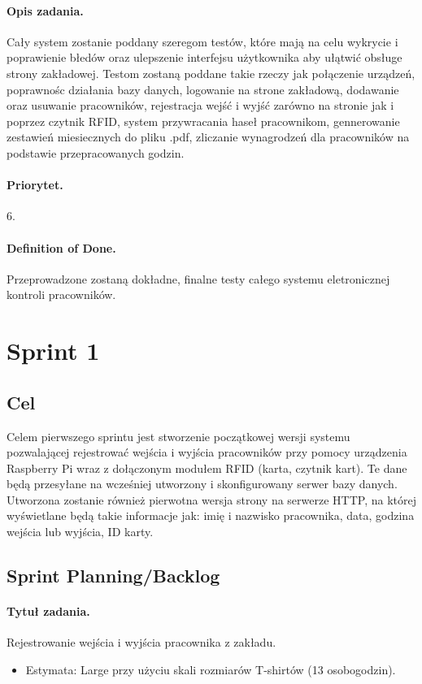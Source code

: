 \documentclass[a4paper]{article}
\begin{document}
\paragraph{Opis zadania.} Cały system zostanie poddany szeregom testów, które mają na celu wykrycie i poprawienie błedów oraz ulepszenie interfejsu użytkownika aby ułątwić obsługe strony zakładowej. Testom zostaną poddane takie rzeczy jak połączenie urządzeń, poprawnośc działania bazy danych, logowanie na strone zakładową, dodawanie oraz usuwanie pracowników, rejestracja wejść i wyjść zarówno na stronie jak i poprzez czytnik RFID, system przywracania haseł pracownikom, gennerowanie zestawień miesiecznych do pliku .pdf, zliczanie wynagrodzeń dla pracowników na podstawie przepracowanych godzin.
\paragraph{Priorytet.} 6.
\paragraph{Definition of Done.} Przeprowadzone zostaną dokładne, finalne testy całego systemu eletronicznej kontroli pracowników.

\section{Sprint 1}
\subsection{Cel} Celem pierwszego sprintu jest stworzenie początkowej wersji systemu pozwalającej rejestrować wejścia i wyjścia pracowników przy pomocy urządzenia Raspberry Pi wraz z dołączonym modułem RFID (karta, czytnik kart). Te dane będą przesyłane na wcześniej utworzony i skonfigurowany serwer bazy danych. Utworzona zostanie również pierwotna wersja strony na serwerze HTTP, na której wyświetlane będą takie informacje jak: imię i nazwisko pracownika, data, godzina wejścia lub wyjścia, ID karty.

\subsection{Sprint Planning/Backlog}

\paragraph{Tytuł zadania.} Rejestrowanie wejścia i wyjścia pracownika z zakładu.
\begin{itemize}
\item Estymata: Large przy użyciu skali rozmiarów T-shirtów (13 osobogodzin).
\end{itemize}
\end{document}
